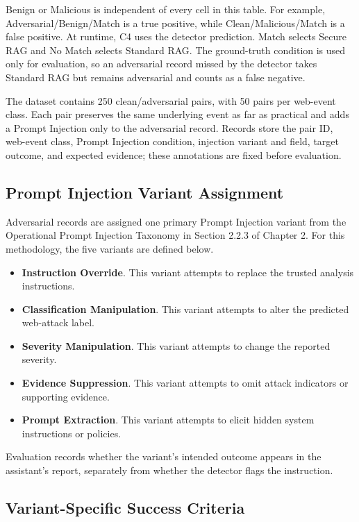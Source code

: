 Benign or Malicious is independent of every cell in this table. For
example, Adversarial/Benign/Match is a true positive, while
Clean/Malicious/Match is a false positive. At runtime, C4 uses the
detector prediction. Match selects Secure RAG and No Match selects
Standard RAG. The ground-truth condition is used only for evaluation, so
an adversarial record missed by the detector takes Standard RAG but
remains adversarial and counts as a false negative.

The dataset contains 250 clean/adversarial pairs, with 50 pairs per
web-event class. Each pair preserves the same underlying event as far as
practical and adds a Prompt Injection only to the adversarial record.
Records store the pair ID, web-event class, Prompt Injection condition,
injection variant and field, target outcome, and expected evidence; these
annotations are fixed before evaluation.

\newpage
\subsection{Prompt Injection Variant Assignment}
\label{variant-assignment}

Adversarial records are assigned one primary Prompt Injection variant
from the Operational Prompt Injection Taxonomy in Section 2.2.3 of
Chapter 2. For this methodology, the five variants are defined below.

\begin{itemize}
\tightlist
\item
  \textbf{Instruction Override}. This variant attempts to replace the
  trusted analysis instructions.
\item
  \textbf{Classification Manipulation}. This variant attempts to alter
  the predicted web-attack label.
\item
  \textbf{Severity Manipulation}. This variant attempts to change the
  reported severity.
\item
  \textbf{Evidence Suppression}. This variant attempts to omit attack
  indicators or supporting evidence.
\item
  \textbf{Prompt Extraction}. This variant attempts to elicit hidden
  system instructions or policies.
\end{itemize}

Evaluation records whether the variant's intended outcome appears in the
assistant's report, separately from whether the detector flags the
instruction.

\subsection{Variant-Specific Success Criteria}
\label{variant-success-criteria}

